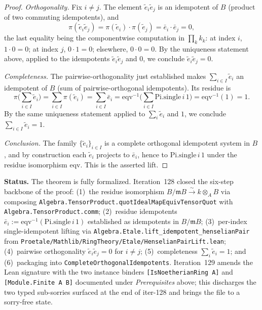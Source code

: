 \begin{proof}
  \medskip

  \emph{Orthogonality.} Fix $i \ne j$. The element
  $\tilde e_i \tilde e_j$ is an idempotent of $B$
  (product of two commuting idempotents), and
  \[
    \pi(\tilde e_i \tilde e_j)
    = \pi(\tilde e_i) \cdot \pi(\tilde e_j)
    = \bar e_i \cdot \bar e_j
    = 0,
  \]
  the last equality being the componentwise computation in
  $\prod_k k_k$: at index $i$, $1 \cdot 0 = 0$; at index $j$,
  $0 \cdot 1 = 0$; elsewhere, $0 \cdot 0 = 0$. By the uniqueness
  statement above, applied to the idempotents $\tilde e_i \tilde e_j$
  and $0$, we conclude $\tilde e_i \tilde e_j = 0$.

  \medskip

  \emph{Completeness.} The pairwise-orthogonality just established
  makes $\sum_{i \in I} \tilde e_i$ an idempotent of $B$
  (sum of pairwise-orthogonal idempotents). Its residue is
  \[
    \pi\bigl(\textstyle\sum_{i \in I} \tilde e_i\bigr)
    = \textstyle\sum_{i \in I} \pi(\tilde e_i)
    = \textstyle\sum_{i \in I} \bar e_i
    = \mathrm{eqv}^{-1}\bigl(\textstyle\sum_{i \in I}
        \mathrm{Pi.single}\,i\,1\bigr)
    = \mathrm{eqv}^{-1}(1)
    = 1.
  \]
  By the same uniqueness statement applied to
  $\sum_i \tilde e_i$ and $1$, we conclude
  $\sum_{i \in I} \tilde e_i = 1$.

  \medskip

  \emph{Conclusion.} The family $\{\tilde e_i\}_{i \in I}$ is a
  complete orthogonal idempotent system in $B$, and by construction
  each $\tilde e_i$ projects to $\bar e_i$, hence to
  $\mathrm{Pi.single}\,i\,1$ under the residue isomorphism
  $\mathrm{eqv}$. This is the asserted lift.
\end{proof}

\medskip\noindent\textbf{Status.} The theorem is fully formalized.
Iteration~128 closed the six-step backbone of the proof:
(1)~the residue isomorphism $B / \mathfrak{m} B \xrightarrow{\sim}
k \otimes_A B$ via composing
\texttt{Algebra.TensorProduct.quotIdealMapEquivTensorQuot} with
\texttt{Algebra.TensorProduct.comm};
(2)~residue idempotents $\bar e_i := \mathrm{eqv}^{-1}(\mathrm{Pi.single}\,i\,1)$
established as idempotents in $B / \mathfrak{m} B$;
(3)~per-index single-idempotent lifting via
\texttt{Algebra.Etale.lift\_idempotent\_henselianPair} from
\texttt{Proetale/Mathlib/RingTheory/Etale/HenselianPairLift.lean};
(4)~pairwise orthogonality $\tilde e_i \tilde e_j = 0$ for $i \ne j$;
(5)~completeness $\sum_i \tilde e_i = 1$; and
(6)~packaging into \texttt{CompleteOrthogonalIdempotents}. Iteration~129
amends the Lean signature with the two instance binders
\texttt{[IsNoetherianRing A]} and \texttt{[Module.Finite A B]}
documented under \emph{Prerequisites} above; this discharges the two
typed sub-sorries surfaced at the end of iter-128 and brings the file
to a sorry-free state.

